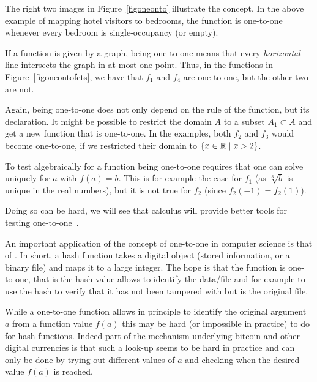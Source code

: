 The right two images in Figure~\ref{figoneonto} illustrate the concept.
In the above example of mapping hotel visitors to bedrooms, the function is one-to-one
whenever every bedroom is single-occupancy (or empty).
\medskip

If a function is given by a graph, being one-to-one means that every {\em horizontal}
line intersects the graph in at most one point. Thus,
in the functions in Figure~\ref{figoneontofcts}, we have that $f_1$ and $f_4$ are
one-to-one, but the other two are not.

Again, being one-to-one does not only depend on the rule of the function, but its
declaration. It might be possible to restrict the domain $A$ to a subset $A_1\subset A$
and get a new function that is one-to-one. In the examples, both $f_2$ and $f_3$ would
become one-to-one, if we restricted their domain to $\{x\in{\mathbb R}\mid x>2\}$.
\medskip

To test algebraically for a function being one-to-one requires that one can solve
uniquely for $a$ with $f(a)=b$. This is for example the case for $f_1$ (as
$\sqrt[3]{b}$ is unique in the real numbers), but it is not true for $f_2$ (since
$f_2(-1)=f_2(1)$).

Doing so can be hard, we will see that calculus will provide better tools
for testing one-to-one~.

An important application of the concept of one-to-one in computer science is
that of . In short, a hash function takes a digital
object (stored information, or a binary file) and maps it to a large
integer. The hope is that the function is one-to-one, that is the hash value allows to
identify the data/file and for example to use the hash to verify that it has
not been tampered with but is the original file.

While a one-to-one function allows in principle to identify the original
argument $a$ from a function value $f(a)$ this may be hard (or impossible in
practice) to do for hash functions. Indeed part of the mechanism underlying
bitcoin and other digital currencies is that such a look-up seems to be hard
in practice and can only be done by trying out different values of $a$ and
checking when the desired value $f(a)$ is reached.
\medskip

